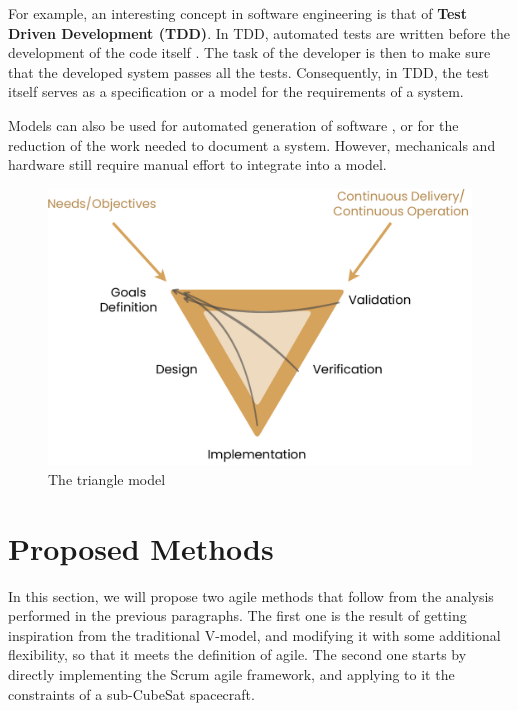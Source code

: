 \documentclass[]{iac}
\begin{document}
For example, an interesting concept in software engineering is that of \textbf{Test Driven Development (TDD)}. In TDD, automated tests are written before the development of the code itself \autocite{beck_test_2002}. The task of the developer is then to make sure that the developed system passes all the tests. Consequently, in TDD, the test itself serves as a specification or a model for the requirements of a system.

Models can also be used for automated generation of software \autocite{perrotin_taste_2012,bychkov_using_2018}, or for the reduction of the work needed to document a system. However, mechanicals and hardware \autocite{de_vos_documentation_2022} still require manual effort to integrate into a model.



\begin{figure}
    \centering
    \includegraphics[width=\linewidth]{media/Triangle.drawio.pdf}
    \caption{The triangle model}
    \label{fig:nabla-model}
\end{figure}

\section{Proposed Methods}
\label{sec:proposed_methods}

In this section, we will propose two agile methods that follow from the analysis performed in the previous paragraphs. The first one is the result of getting inspiration from the traditional V-model, and modifying it with some additional flexibility, so that it meets the definition of agile. The second one starts by directly implementing the Scrum agile framework, and applying to it the constraints of a sub-CubeSat spacecraft.
\end{document}
